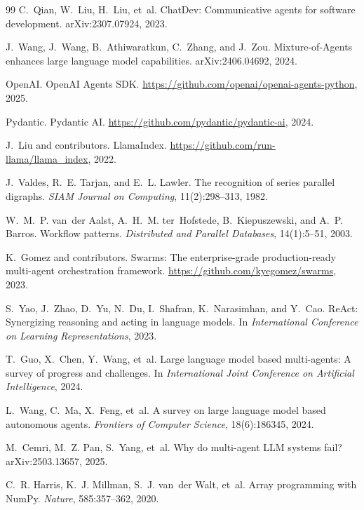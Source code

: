 \documentclass[11pt]{article}
\begin{document}
\begin{thebibliography}{99}
C.~Qian, W.~Liu, H.~Liu, et~al.
\newblock ChatDev: Communicative agents for software development.
\newblock arXiv:2307.07924, 2023.

J.~Wang, J.~Wang, B.~Athiwaratkun, C.~Zhang, and J.~Zou.
\newblock Mixture-of-Agents enhances large language model capabilities.
\newblock arXiv:2406.04692, 2024.

OpenAI.
\newblock OpenAI Agents SDK.
\newblock \url{https://github.com/openai/openai-agents-python}, 2025.

Pydantic.
\newblock Pydantic AI.
\newblock \url{https://github.com/pydantic/pydantic-ai}, 2024.

J.~Liu and contributors.
\newblock LlamaIndex.
\newblock \url{https://github.com/run-llama/llama_index}, 2022.

J.~Valdes, R.~E. Tarjan, and E.~L. Lawler.
\newblock The recognition of series parallel digraphs.
\newblock \emph{SIAM Journal on Computing}, 11(2):298--313, 1982.

W.~M.~P. van~der Aalst, A.~H.~M. ter~Hofstede, B.~Kiepuszewski, and A.~P. Barros.
\newblock Workflow patterns.
\newblock \emph{Distributed and Parallel Databases}, 14(1):5--51, 2003.

K.~Gomez and contributors.
\newblock Swarms: The enterprise-grade production-ready multi-agent orchestration framework.
\newblock \url{https://github.com/kyegomez/swarms}, 2023.

S.~Yao, J.~Zhao, D.~Yu, N.~Du, I.~Shafran, K.~Narasimhan, and Y.~Cao.
\newblock ReAct: Synergizing reasoning and acting in language models.
\newblock In \emph{International Conference on Learning Representations}, 2023.

T.~Guo, X.~Chen, Y.~Wang, et~al.
\newblock Large language model based multi-agents: A survey of progress and challenges.
\newblock In \emph{International Joint Conference on Artificial Intelligence}, 2024.

L.~Wang, C.~Ma, X.~Feng, et~al.
\newblock A survey on large language model based autonomous agents.
\newblock \emph{Frontiers of Computer Science}, 18(6):186345, 2024.

M.~Cemri, M.~Z. Pan, S.~Yang, et~al.
\newblock Why do multi-agent LLM systems fail?
\newblock arXiv:2503.13657, 2025.

C.~R. Harris, K.~J. Millman, S.~J. van~der Walt, et~al.
\newblock Array programming with NumPy.
\newblock \emph{Nature}, 585:357--362, 2020.


\end{thebibliography}
\end{document}
